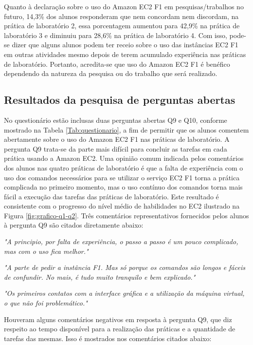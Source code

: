 Quanto à declaração sobre o uso do Amazon EC2 F1 em pesquisas/trabalhos no futuro, 14,3\% dos alunos responderam que nem concordam nem discordam, na prática de laboratório 2, essa porcentagem aumentou para 42,9\% na prática de laboratório 3 e diminuiu para 28,6\% na prática de laboratório 4. Com isso, pode-se dizer que alguns alunos podem ter receio sobre o uso das instâncias EC2 F1 em outras atividades mesmo depois de terem acumulado experiência nas práticas de laboratório. Portanto, acredita-se que uso do Amazon EC2 F1 é benéfico dependendo da natureza da pesquisa ou do trabalho que será realizado.

\subsection{Resultados da pesquisa de  perguntas abertas}

No questionário estão inclusas duas perguntas abertas Q9 e Q10, conforme mostrado na Tabela \ref{Tab:questionario}, a fim de permitir que os alunos comentem abertamente sobre o uso do Amazon EC2 F1 nas práticas de laboratório. A pergunta Q9 trata-se da parte mais difícil para concluir as tarefas em cada prática usando a Amazon EC2. Uma opinião comum indicada pelos comentários dos alunos nas quatro práticas de laboratório é que a falta de experiência com o uso dos comandos necessários para se utilizar o serviço EC2 F1 torna a prática complicada no primeiro momento, mas o uso contínuo dos comandos torna mais fácil a execução das tarefas das práticas de laboratório. Este resultado é consistente com o progresso do nível médio de habilidades no EC2 ilustrado na Figura \ref{fig:grafico-q1-q2}. Três comentários representativos fornecidos pelos alunos à pergunta Q9 são citados diretamente abaixo:


\textit{"A principio, por falta de experiência, o passo a passo é um pouco complicado, mas com o uso fica melhor."}

\textit{"A parte de pedir a instância F1. Mas só porque os comandos são longos e fáceis de confundir. No mais, é tudo muito tranquilo e bem explicado."}

\textit{"Os primeiros contatos com a interface gráfica e a utilização da máquina virtual, o que não foi problemático."}

Houveram alguns comentários negativos em resposta à pergunta Q9, que diz respeito ao tempo disponível para a realização das práticas e a quantidade de tarefas das mesmas. Isso é mostrados nos comentários citados abaixo:

